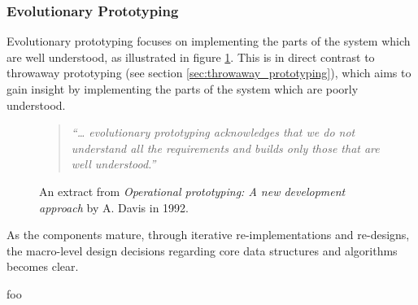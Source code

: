 
\subsubsection{Evolutionary Prototyping}

Evolutionary prototyping focuses on implementing the parts of the system which are well understood, as illustrated in figure \ref{fig:evolutionary_prototyping}. This is in direct contrast to throwaway prototyping (see section \ref{sec:throwaway_prototyping}), which aims to gain insight by implementing the parts of the system which are poorly understood.

\begin{figure}[htbp]
	\begin{quote}
		\textit{``… evolutionary prototyping acknowledges that we do not understand all the requirements and builds only those that are well understood.''} \cite{operational_prototyping}
	\end{quote}
	\caption{An extract from \textit{Operational prototyping: A new development approach} by A. Davis in 1992.}
	\label{fig:evolutionary_prototyping}
\end{figure}





























As the components mature, through iterative re-implementations and re-designs, the macro-level design decisions regarding core data structures and algorithms becomes clear.






foo
